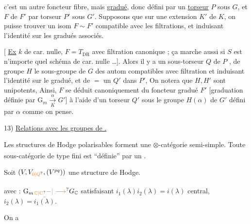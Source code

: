 c'est un autre foncteur fibre, mais \uline{gradué}, donc défini par un \uline{torseur} $P$  sous $G$, et $F$  de $F'$ \unsure{---} par torseur $P'$ sous $G'$. Supposons que sur  une extension $K'$ de $K$, on puisse trouver un isom $F\sim F'$ compatible avec les filtrations, et induisant l'identité sur les gradués associés.

[ \uline{Ex}  $k$ de car. nulle, $F=T_{\mathrm{DR}}$ avec filtration canonique ; ça marche aussi si $S$ est n'importe quel schéma  de car. nulle \ldots ]. Alors il y a un sous-torseur  $Q$ de $P$ , de groupe $H$ le sous-groupe de $G$ des autom compatibles avec filtration et induisant l'identité sur le gradué, et de $=$  un $Q'$ dans $P'$,  On notera que $H,H'$ sont unipotents, Ainsi, $F$ se déduit canoniquement du foncteur gradué $F'$ [graduation définie par $\mathrm G_m\xrightarrow[K]{\alpha}G'$] à l'aide d'un torseur $Q'$ sous le groupe  $H(\alpha)$ de $G'$ défini par $\alpha$ comme on pense.


13) \uline{Relations avec les groupes de .}

Les structures de Hodge polarisables forment une $\otimes$-catégorie semi-simple. Toute sous-\deleted{\unsure{$\otimes$}}catégorie de type fini est ``définie'' par un  \textsuperscript{}.

Soit $(V,V_{\unsure{0|Q}},(V^{pq}))$ une structure de Hodge.

\textsuperscript{} avec  : $\mathrm G_{m\,\unsure{\mathbb C|\mathrm C}}\unsure{-|\longrightarrow}G_{\mathbb C}$ satisfaisant $i_1(\lambda)i_2(\lambda)=i(\lambda)$ central, $i_2(\lambda)=\overline{i_1(\lambda)}$.

On a 

